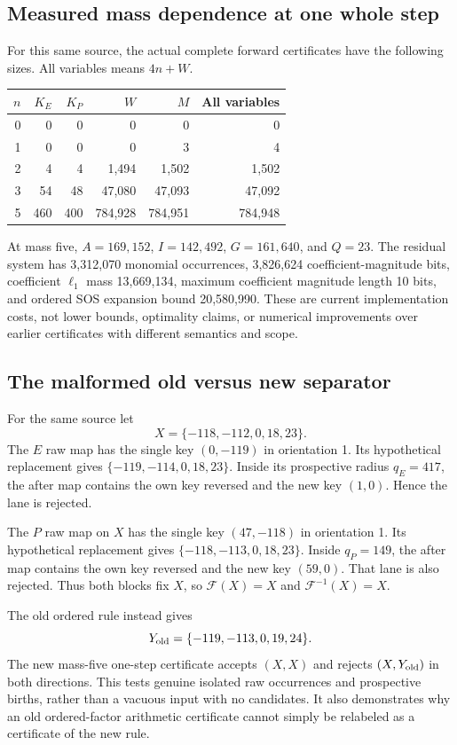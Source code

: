 \documentclass[11pt,a4paper]{article}
\numberwithin{equation}{section}
\newcommand{\CA}{\mathcal F}\newcommand{\tabsize}{S_{\rm tab}}\newcommand{\Dv}{D_{\rm v}}
\begin{document}
\subsection{Measured mass dependence at one whole step}
For this same source, the actual complete forward certificates have the following sizes. All variables means $4n+W$.
\begin{center}
\begin{tabular}{@{}rrrrrr@{}}\toprule
$n$ & $K_E$ & $K_P$ & $W$ & $M$ & All variables\\\midrule
0 & 0 & 0 & 0 & 0 & 0\\
1 & 0 & 0 & 0 & 3 & 4\\
2 & 4 & 4 & 1,494 & 1,502 & 1,502\\
3 & 54 & 48 & 47,080 & 47,093 & 47,092\\
5 & 460 & 400 & 784,928 & 784,951 & 784,948\\\bottomrule
\end{tabular}
\end{center}
At mass five, $A=169{,}152$, $I=142{,}492$, $G=161{,}640$, and $Q=23$. The residual system has 3,312,070 monomial occurrences, 3,826,624 coefficient-magnitude bits, coefficient $\ell_1$ mass 13,669,134, maximum coefficient magnitude length 10 bits, and ordered SOS expansion bound 20,580,990. These are current implementation costs, not lower bounds, optimality claims, or numerical improvements over earlier certificates with different semantics and scope.

\subsection{The malformed old versus new separator}\label{fpa:pq:sec:cascade}
For the same source let
\[
X=\{-118,-112,0,18,23\}.
\]
The $E$ raw map has the single key $(0,-119)$ in orientation 1. Its hypothetical replacement gives $\{-119,-114,0,18,23\}$. Inside its prospective radius $q_E=417$, the after map contains the own key reversed and the new key $(1,0)$. Hence the lane is rejected.

The $P$ raw map on $X$ has the single key $(47,-118)$ in orientation 1. Its hypothetical replacement gives $\{-118,-113,0,18,23\}$. Inside $q_P=149$, the after map contains the own key reversed and the new key $(59,0)$. That lane is also rejected. Thus both blocks fix $X$, so $\CA(X)=X$ and $\CA^{-1}(X)=X$.

The old ordered rule instead gives
\[
Y_{\rm old}=\{-119,-113,0,19,24\}.
\]
The new mass-five one-step certificate accepts $(X,X)$ and rejects $(X,Y_{\rm old})$ in both directions. This tests genuine isolated raw occurrences and prospective births, rather than a vacuous input with no candidates. It also demonstrates why an old ordered-factor arithmetic certificate cannot simply be relabeled as a certificate of the new rule.
\end{document}

